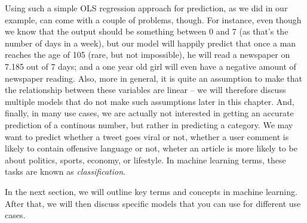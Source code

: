 Using such a simple OLS regression approach for prediction, as we did in our
example, can come with a couple of problems, though.
For instance, even though we know that the output should be something between
0 and 7 (as that's the number of days in a week), but our model will happily
predict that once a man reaches the age of 105 (rare, but not impossible), he
will read a newspaper on 7.185 out of 7 days; and a one year old girl will
even have a negative amount of newspaper reading.
Also, more in general, it is quite an assumption to make that the relationship
between these variables are linear -- we will therefore discuss multiple
models that do not make such assumptions later in this chapter.
And, finally, in many use cases, we are actually not interested in getting
an accurate prediction of a continous number, but rather in predicting a
category. We may want to predict whether a tweet goes viral or not, whether
a user comment is likely to contain offensive language or not, wheter an article
is more likely to be about politics, sports, economy, or lifestyle.
In machine learning terms, these tasks are known as \emph{classification}.

In the next section, we will outline key terms and concepts in machine
learning. After that, we will then discuss specific models that you
can use for different use cases.
